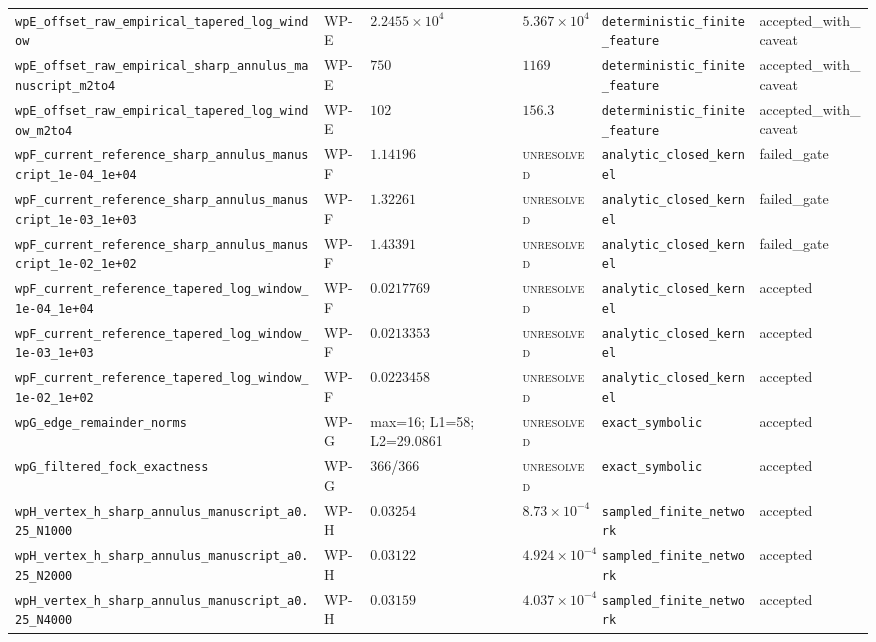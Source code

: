 \begin{table}[t]
\begin{tabular}{@{}llllll@{}}
\texttt{wpE\_offset\_raw\_empirical\_tapered\_log\_window} & WP-E & $2.2455\times10^{4}$ & $5.367\times10^{4}$ & \texttt{deterministic\_finite\_feature} & accepted\_with\_caveat \\
\texttt{wpE\_offset\_raw\_empirical\_sharp\_annulus\_manuscript\_m2to4} & WP-E & $750$ & $1169$ & \texttt{deterministic\_finite\_feature} & accepted\_with\_caveat \\
\texttt{wpE\_offset\_raw\_empirical\_tapered\_log\_window\_m2to4} & WP-E & $102$ & $156.3$ & \texttt{deterministic\_finite\_feature} & accepted\_with\_caveat \\
\texttt{wpF\_current\_reference\_sharp\_annulus\_manuscript\_1e-04\_1e+04} & WP-F & $1.14196$ & \textsc{unresolved} & \texttt{analytic\_closed\_kernel} & failed\_gate \\
\texttt{wpF\_current\_reference\_sharp\_annulus\_manuscript\_1e-03\_1e+03} & WP-F & $1.32261$ & \textsc{unresolved} & \texttt{analytic\_closed\_kernel} & failed\_gate \\
\texttt{wpF\_current\_reference\_sharp\_annulus\_manuscript\_1e-02\_1e+02} & WP-F & $1.43391$ & \textsc{unresolved} & \texttt{analytic\_closed\_kernel} & failed\_gate \\
\texttt{wpF\_current\_reference\_tapered\_log\_window\_1e-04\_1e+04} & WP-F & $0.0217769$ & \textsc{unresolved} & \texttt{analytic\_closed\_kernel} & accepted \\
\texttt{wpF\_current\_reference\_tapered\_log\_window\_1e-03\_1e+03} & WP-F & $0.0213353$ & \textsc{unresolved} & \texttt{analytic\_closed\_kernel} & accepted \\
\texttt{wpF\_current\_reference\_tapered\_log\_window\_1e-02\_1e+02} & WP-F & $0.0223458$ & \textsc{unresolved} & \texttt{analytic\_closed\_kernel} & accepted \\
\texttt{wpG\_edge\_remainder\_norms} & WP-G & max=16; L1=58; L2=29.0861 & \textsc{unresolved} & \texttt{exact\_symbolic} & accepted \\
\texttt{wpG\_filtered\_fock\_exactness} & WP-G & 366/366 & \textsc{unresolved} & \texttt{exact\_symbolic} & accepted \\
\texttt{wpH\_vertex\_h\_sharp\_annulus\_manuscript\_a0.25\_N1000} & WP-H & $0.03254$ & $8.73\times10^{-4}$ & \texttt{sampled\_finite\_network} & accepted \\
\texttt{wpH\_vertex\_h\_sharp\_annulus\_manuscript\_a0.25\_N2000} & WP-H & $0.03122$ & $4.924\times10^{-4}$ & \texttt{sampled\_finite\_network} & accepted \\
\texttt{wpH\_vertex\_h\_sharp\_annulus\_manuscript\_a0.25\_N4000} & WP-H & $0.03159$ & $4.037\times10^{-4}$ & \texttt{sampled\_finite\_network} & accepted \\

\end{tabular}
\end{table}
